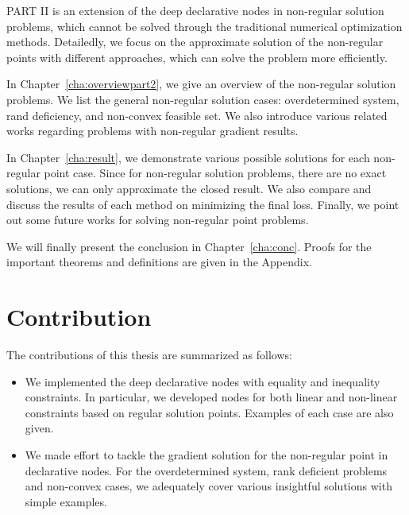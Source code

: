 \par PART II is an extension of the deep declarative nodes in non-regular solution problems, which cannot be solved through the traditional numerical optimization methods. Detailedly, we focus on the approximate solution of the non-regular points with different approaches, which can solve the problem more efficiently. 
\begin{description}
    \item In Chapter~\ref{cha:overviewpart2}, we give an overview of the non-regular solution problems. We list the general non-regular solution cases: overdetermined system, rand deficiency, and non-convex feasible set. We also introduce various related works regarding problems with non-regular gradient results. 
    \item In Chapter~\ref{cha:result}, we demonstrate various possible solutions for each non-regular point case. Since for non-regular solution problems, there are no exact solutions, we can only approximate the closed result. We also compare and discuss the results of each method on minimizing the final loss. Finally, we point out some future works for solving non-regular point problems. 
\end{description}
We will finally present the conclusion in Chapter~\ref{cha:conc}. Proofs for the important theorems and definitions are given in the Appendix.

\section{Contribution}
\label{sec.contribution}
The contributions of this thesis are summarized as follows: 
\begin{itemize}
    \item We implemented the deep declarative nodes with equality and inequality constraints. In particular, we developed nodes for both linear and non-linear constraints based on regular solution points. Examples of each case are also given. 

    \item We made effort to tackle the gradient solution for the non-regular point in declarative nodes. For the overdetermined system, rank deficient problems and non-convex cases, we adequately cover various insightful solutions with simple examples. 
\end{itemize}